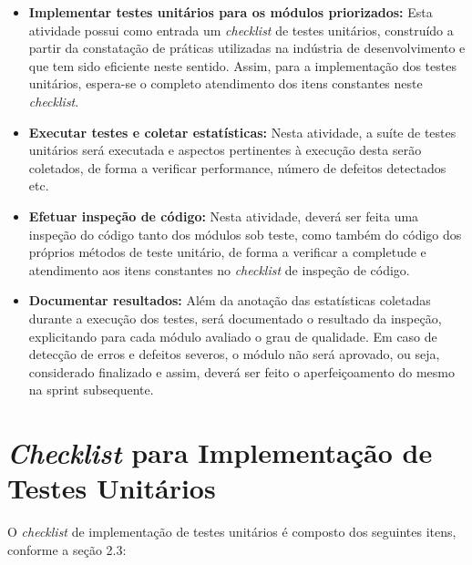 \begin{itemize}
	\item \textbf{Implementar testes unitários para os módulos priorizados:} Esta atividade possui como entrada um \textit{checklist} de testes unitários, construído a partir da constatação de práticas utilizadas na indústria de desenvolvimento e que tem sido eficiente neste sentido. Assim, para a implementação dos testes unitários, espera-se o completo atendimento dos itens constantes neste \textit{checklist}.

	\item \textbf{Executar testes e coletar estatísticas:} Nesta atividade, a suíte de testes unitários será executada e aspectos pertinentes à execução desta serão coletados, de forma a verificar performance, número de defeitos detectados etc.

	\item \textbf{Efetuar inspeção de código:} Nesta atividade, deverá ser feita uma inspeção do código tanto dos módulos sob teste, como também do código dos próprios métodos de teste unitário, de forma a verificar a completude e atendimento aos itens constantes no \textit{checklist} de inspeção de código.

	\item \textbf{Documentar resultados:} Além da anotação das estatísticas coletadas durante a execução dos testes, será documentado o resultado da inspeção, explicitando para cada módulo avaliado o grau de qualidade. Em caso de detecção de erros e defeitos severos, o módulo não será aprovado, ou seja, considerado finalizado e assim, deverá ser feito o aperfeiçoamento do mesmo na sprint subsequente.
\end{itemize}

\section{\textit{Checklist} para Implementação de Testes Unitários}

O \textit{checklist} de implementação de testes unitários é composto dos seguintes itens, conforme a seção 2.3:

